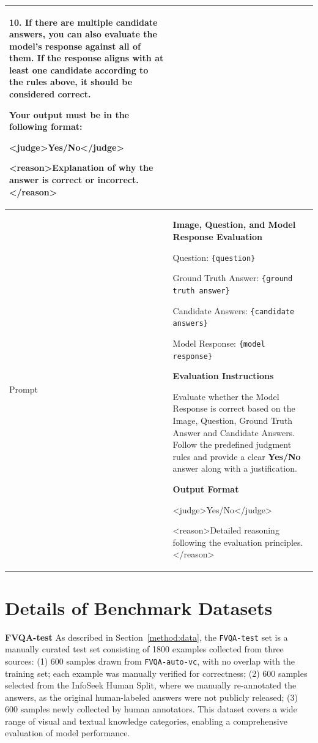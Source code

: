 \documentclass{article}
\begin{document}
\begin{table}[t]
\begin{tabular}{p{1cm}|p{12cm}}
10. If there are multiple candidate answers, you can also evaluate the model's response against all of them. If the response aligns with at least one candidate according to the rules above, it should be considered correct. 

Your output must be in the following format:

<judge>Yes/No</judge>

<reason>Explanation of why the answer is correct or incorrect.</reason> \\ \midrule
Prompt & \textbf{Image, Question, and Model Response Evaluation}

Question: \texttt{\{question\}}

Ground Truth Answer: \texttt{\{ground truth answer\}}

Candidate Answers: \texttt{\{candidate answers\}}

Model Response: \texttt{\{model response\}}

\textbf{Evaluation Instructions}

Evaluate whether the Model Response is correct based on the Image, Question, Ground Truth Answer and Candidate Answers. Follow the predefined judgment rules and provide a clear \textbf{Yes/No} answer along with a justification.

\textbf{Output Format}

<judge>Yes/No</judge>

<reason>Detailed reasoning following the evaluation principles.</reason>
\\ \bottomrule
\end{tabular}
\end{table}

\section{Details of Benchmark Datasets}
\label{appendix:benchmark-details}
\textbf{FVQA-test} As described in Section~\ref{method:data}, the \texttt{FVQA-test} set is a manually curated test set consisting of 1800 examples collected from three sources:
(1) 600 samples drawn from \texttt{FVQA-auto-vc}, with no overlap with the training set; each example was manually verified for correctness;
(2) 600 samples selected from the InfoSeek Human Split, where we manually re-annotated the answers, as the original human-labeled answers were not publicly released;
(3) 600 samples newly collected by human annotators.
This dataset covers a wide range of visual and textual knowledge categories, enabling a comprehensive evaluation of model performance.
\end{document}
